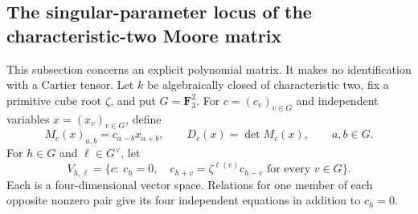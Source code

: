 \subsection{The singular-parameter locus of the characteristic-two Moore matrix}

This subsection concerns an explicit polynomial matrix.  It makes no
identification with a Cartier tensor.  Let \(k\) be algebraically closed
of characteristic two, fix a primitive cube root \(\zeta\), and put
\(G=\mathbf F_3^2\).  For \(c=(c_v)_{v\in G}\) and independent
variables \(x=(x_v)_{v\in G}\), define
\[
 M_c(x)_{a,b}=c_{a-b}x_{a+b},\qquad
 D_c(x)=\det M_c(x),\qquad a,b\in G.                 \tag{DE-MC1}
\]
For \(h\in G\) and \(\ell\in G^\vee\), let
\[
 V_{h,\ell}=\{c:\ c_h=0,\quad
 c_{h+v}=\zeta^{\ell(v)}c_{h-v}\text{ for every }v\in G\}.
                                                               \tag{DE-MC2}
\]
Each is a four-dimensional vector space.  Relations for one member
of each opposite nonzero pair give its four independent equations
in addition to \(c_h=0\).


